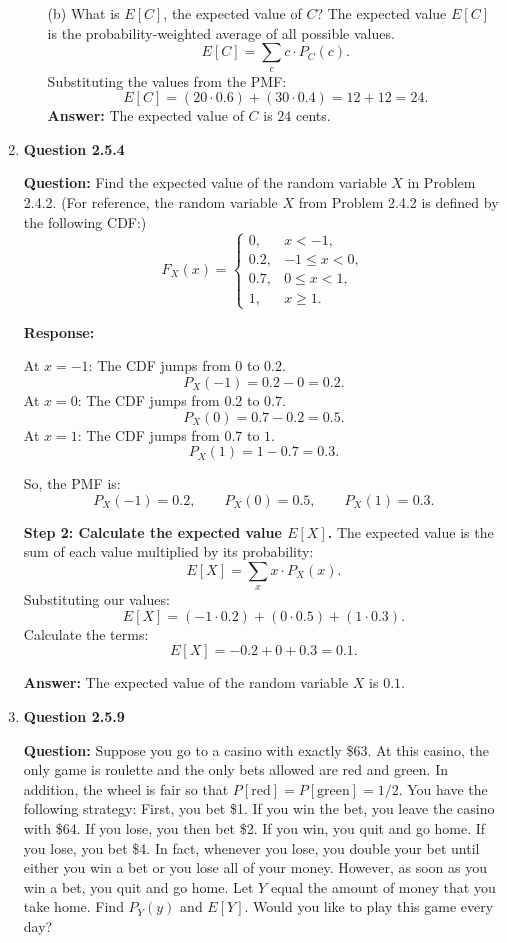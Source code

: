 \documentclass[12pt]{article}
\begin{document}
\begin{enumerate}[label=\textbf{\arabic*.}, leftmargin=*]
\begin{itemize}
  \item[(b)] What is $E[C]$, the expected value of $C$? The expected value $E[C]$ is the probability-weighted average of all possible values.
  \[
  E[C]=\sum_c c\cdot P_C(c).
  \]
  Substituting the values from the PMF:
  \[
  E[C]=(20\cdot 0.6)+(30\cdot 0.4)=12+12=24.
  \]
  \textbf{Answer:} The expected value of $C$ is $24$ cents.
\end{itemize}

\newpage

\item \textbf{Question 2.5.4}

\textbf{Question:} Find the expected value of the random variable $X$ in Problem 2.4.2. (For reference, the random variable $X$ from Problem 2.4.2 is defined by the following CDF:)
\[
F_X(x)=
\begin{cases}
0, & x<-1,\\
0.2, & -1\le x<0,\\
0.7, & 0\le x<1,\\
1, & x\ge 1.
\end{cases}
\]

\vspace{0.3in}

\textbf{Response:}

At $x=-1$: The CDF jumps from $0$ to $0.2$.
\[
P_X(-1)=0.2-0=0.2.
\]
At $x=0$: The CDF jumps from $0.2$ to $0.7$.
\[
P_X(0)=0.7-0.2=0.5.
\]
At $x=1$: The CDF jumps from $0.7$ to $1$.
\[
P_X(1)=1-0.7=0.3.
\]

So, the PMF is:
\[
P_X(-1)=0.2,\qquad P_X(0)=0.5,\qquad P_X(1)=0.3.
\]

\textbf{Step 2: Calculate the expected value $E[X]$.} The expected value is the sum of each value multiplied by its probability:
\[
E[X]=\sum_x x\cdot P_X(x).
\]
Substituting our values:
\[
E[X]=(-1\cdot 0.2)+(0\cdot 0.5)+(1\cdot 0.3).
\]
Calculate the terms:
\[
E[X]=-0.2+0+0.3=0.1.
\]

\textbf{Answer:} The expected value of the random variable $X$ is $0.1$.

\newpage
\item \textbf{Question 2.5.9}

\textbf{Question:} Suppose you go to a casino with exactly \$63. At this casino, the only game is roulette and the only bets allowed are red and green. In addition, the wheel is fair so that $P[\text{red}]=P[\text{green}]=1/2$. You have the following strategy: First, you bet \$1. If you win the bet, you leave the casino with \$64. If you lose, you then bet \$2. If you win, you quit and go home. If you lose, you bet \$4. In fact, whenever you lose, you double your bet until either you win a bet or you lose all of your money. However, as soon as you win a bet, you quit and go home. Let $Y$ equal the amount of money that you take home. Find $P_Y(y)$ and $E[Y]$. Would you like to play this game every day?


\end{enumerate}
\end{document}
